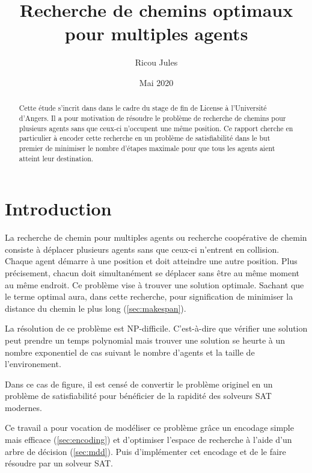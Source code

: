 \documentclass[french, 12pt, letterpaper]{article}
\title{Recherche de chemins optimaux pour multiples agents}
\author{Ricou Jules}
\date{Mai 2020}
\theoremstyle{definition}
\theoremstyle{proposition}
\theoremstyle{example}
\begin{document}
    \maketitle

    \begin{abstract}
        Cette étude s'incrit dans dans le cadre du stage de fin de License à l'Université d'Angers. 
        Il a pour motivation de résoudre le problème de recherche de chemins pour plusieurs agents sans
        que ceux-ci n'occupent une même position.
        Ce rapport cherche en particulier à encoder cette recherche en un problème de satisfiabilité
        dans le but premier de minimiser le nombre d'étapes maximale pour que tous les agents aient atteint leur destination.
    \end{abstract}

    \newpage

    \tableofcontents

    \newpage
    \section*{Introduction}

    La recherche de chemin pour multiples agents ou recherche coopérative de chemin consiste à déplacer plusieurs agents sans que ceux-ci n'entrent en collision.
    Chaque agent démarre à une position et doit atteindre une autre position. 
    Plus précisement, chacun doit simultanément se déplacer sans être au même moment au même endroit.
    Ce problème vise à trouver une solution optimale.
    Sachant que le terme optimal aura, dans cette recherche, pour signification de minimiser la distance du chemin
    le plus long (\ref{sec:makespan}).

    La résolution de ce problème est NP-difficile. 
    C'est-à-dire que vérifier une solution peut prendre un temps polynomial mais trouver une solution se heurte à un nombre exponentiel
    de cas suivant le nombre d'agents et la taille de l'environement.

    Dans ce cas de figure, il est censé de convertir le problème originel en un problème de satisfiabilité
    pour bénéficier de la rapidité des solveurs SAT modernes. 

    Ce travail a pour vocation de modéliser ce problème grâce un encodage simple mais efficace \cite{PSUR16} (\ref{sec:encoding})
    et d'optimiser l'espace de recherche à l'aide d'un arbre de décision (\ref{sec:mdd}).
    Puis d'implémenter cet encodage et de le faire résoudre par un solveur SAT.
\end{document}
